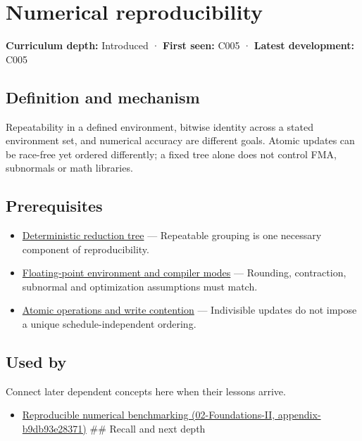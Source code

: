 \hypertarget{appendix-5f1a2c3f97ff}{}
\section{Numerical reproducibility}\label{appendix-5f1a2c3f97ff-numerical-reproducibility}

\textbf{Curriculum depth:} Introduced · \textbf{First seen:} C005 · \textbf{Latest development:} C005

\subsection{Definition and mechanism}\label{appendix-5f1a2c3f97ff-definition-and-mechanism}

Repeatability in a defined environment, bitwise identity across a stated environment set, and numerical accuracy are different goals. Atomic updates can be race-free yet ordered differently; a fixed tree alone does not control FMA, subnormals or math libraries.

\subsection{Prerequisites}\label{appendix-5f1a2c3f97ff-prerequisites}

\begin{itemize}
\tightlist
\item
  \hyperref[appendix-4c8e0238e7ee]{Deterministic reduction tree} --- Repeatable grouping is one necessary component of reproducibility.
\item
  \hyperref[appendix-f11d1a521253]{Floating-point environment and compiler modes} --- Rounding, contraction, subnormal and optimization assumptions must match.
\item
  \hyperref[appendix-e12d1b03fefb]{Atomic operations and write contention} --- Indivisible updates do not impose a unique schedule-independent ordering.
\end{itemize}

\subsection{Used by}\label{appendix-5f1a2c3f97ff-used-by}

Connect later dependent concepts here when their lessons arrive.

\begin{itemize}
\tightlist
\item
  \href{../02-Foundations-II/main.pdf\#nameddest=appendix-b9db93e28371}{Reproducible numerical benchmarking (02-Foundations-II, appendix-b9db93e28371)} \#\# Recall and next depth
\end{itemize}

